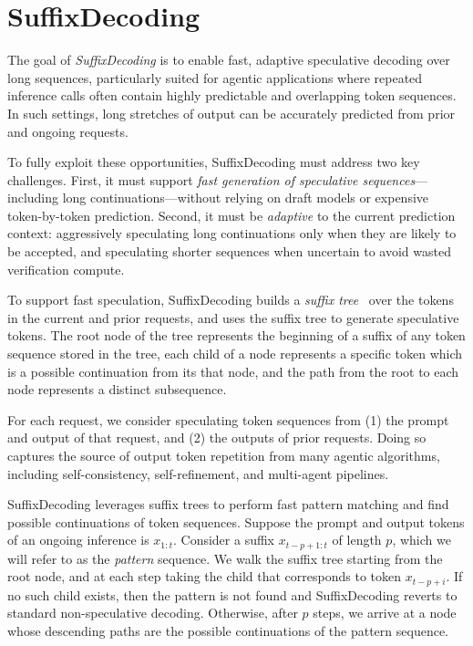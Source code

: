 \section{SuffixDecoding}
\label{sec:suffix-decoding}

The goal of \emph{SuffixDecoding} is to enable fast, adaptive speculative decoding over long sequences, particularly suited for agentic applications where repeated inference calls often contain highly predictable and overlapping token sequences. In such settings, long stretches of output can be accurately predicted from prior and ongoing requests.

To fully exploit these opportunities, SuffixDecoding must address two key challenges. First, it must support \emph{fast generation of speculative sequences}—including long continuations---without relying on draft models or expensive token-by-token prediction. Second, it must be \emph{adaptive} to the current prediction context: aggressively speculating long continuations only when they are likely to be accepted, and speculating shorter sequences when uncertain to avoid wasted verification compute.

To support fast speculation, SuffixDecoding builds a \emph{suffix tree}~\citep{10.1109/SWAT.1973.13} over the tokens in the current and prior requests, and uses the suffix tree to generate speculative tokens.
The root node of the tree represents the beginning of a suffix of any token sequence stored in the tree, each child of a node represents a specific token which is a possible continuation from its that node, and the path from the root to each node represents a distinct subsequence.

For each request, we consider speculating token sequences from (1) the prompt and output of that request, and (2) the outputs of prior requests. Doing so captures the source of output token repetition from many agentic algorithms, including self-consistency, self-refinement, and multi-agent pipelines.

SuffixDecoding leverages suffix trees to perform fast pattern matching and find possible continuations of token sequences. Suppose the prompt and output tokens of an ongoing inference is \( x_{1:t} \). Consider a suffix \( x_{t-p+1:t} \) of length \( p \), which we will refer to as the \emph{pattern} sequence. We walk the suffix tree starting from the root node, and at each step taking the child that corresponds to token \( x_{t-p+i} \). If no such child exists, then the pattern is not found and SuffixDecoding reverts to standard non-speculative decoding. Otherwise, after \( p \) steps, we arrive at a node whose descending paths are the possible continuations of the pattern sequence.

